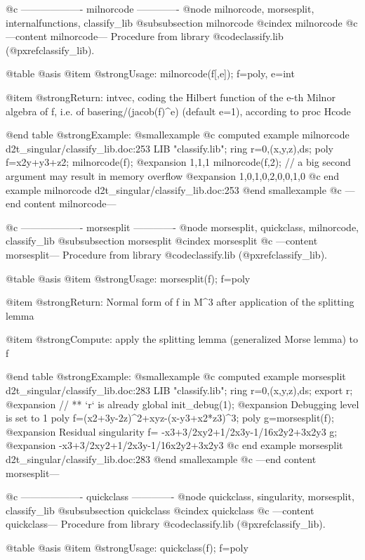 @c ------------------- milnorcode -------------
@node milnorcode, morsesplit, internalfunctions, classify_lib
@subsubsection milnorcode
@cindex milnorcode
@c ---content milnorcode---
Procedure from library @code{classify.lib} (@pxref{classify_lib}).

@table @asis
@item @strong{Usage:}
milnorcode(f[,e]); f=poly, e=int

@item @strong{Return:}
intvec, coding the Hilbert function of the e-th Milnor algebra
of f, i.e. of basering/(jacob(f)^e) (default e=1), according
to proc Hcode

@end table
@strong{Example:}
@smallexample
@c computed example milnorcode d2t_singular/classify_lib.doc:253 
LIB "classify.lib";
ring r=0,(x,y,z),ds;
poly f=x2y+y3+z2;
milnorcode(f);
@expansion{} 1,1,1
milnorcode(f,2);  // a big second argument may result in memory overflow
@expansion{} 1,0,1,0,2,0,0,1,0
@c end example milnorcode d2t_singular/classify_lib.doc:253
@end smallexample
@c ---end content milnorcode---

@c ------------------- morsesplit -------------
@node morsesplit, quickclass, milnorcode, classify_lib
@subsubsection morsesplit
@cindex morsesplit
@c ---content morsesplit---
Procedure from library @code{classify.lib} (@pxref{classify_lib}).

@table @asis
@item @strong{Usage:}
morsesplit(f); f=poly

@item @strong{Return:}
Normal form of f in M^3 after application of the splitting lemma

@item @strong{Compute:}
apply the splitting lemma (generalized Morse lemma) to f

@end table
@strong{Example:}
@smallexample
@c computed example morsesplit d2t_singular/classify_lib.doc:283 
LIB "classify.lib";
ring r=0,(x,y,z),ds;
export r;
@expansion{} // ** `r` is already global
init_debug(1);
@expansion{} Debugging level is set to  1
poly f=(x2+3y-2z)^2+xyz-(x-y3+x2*z3)^3;
poly g=morsesplit(f);
@expansion{} Residual singularity f= -x3+3/2xy2+1/2x3y-1/16x2y2+3x2y3
g;
@expansion{} -x3+3/2xy2+1/2x3y-1/16x2y2+3x2y3
@c end example morsesplit d2t_singular/classify_lib.doc:283
@end smallexample
@c ---end content morsesplit---

@c ------------------- quickclass -------------
@node quickclass, singularity, morsesplit, classify_lib
@subsubsection quickclass
@cindex quickclass
@c ---content quickclass---
Procedure from library @code{classify.lib} (@pxref{classify_lib}).

@table @asis
@item @strong{Usage:}
quickclass(f); f=poly

